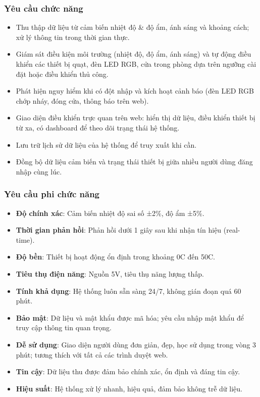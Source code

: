 \subsubsection{Yêu cầu chức năng}
\begin{itemize}
    \item Thu thập dữ liệu từ cảm biến nhiệt độ \& độ ẩm, ánh sáng và khoảng cách; xử lý thông tin trong thời gian thực.
    \item Giám sát điều kiện môi trường (nhiệt độ, độ ẩm, ánh sáng) và tự động điều khiển các thiết bị quạt, đèn LED RGB, cửa trong phòng dựa trên ngưỡng cài đặt hoặc điều khiển thủ công.
    \item Phát hiện nguy hiểm khi có đột nhập và kích hoạt cảnh báo (đèn LED RGB chớp nháy, đóng cửa, thông báo trên web).
    \item Giao diện điều khiển trực quan trên web: hiển thị dữ liệu, điều khiển thiết bị từ xa, có dashboard để theo dõi trạng thái hệ thống.
    \item Lưu trữ lịch sử dữ liệu của hệ thống để truy xuất khi cần.
    \item Đồng bộ dữ liệu cảm biến và trạng thái thiết bị giữa nhiều người dùng đăng nhập cùng lúc.
\end{itemize}

\subsubsection{Yêu cầu phi chức năng}
\begin{itemize}
    \item \textbf{Độ chính xác}: Cảm biến nhiệt độ sai số ±2\%, độ ẩm ±5\%.
    \item \textbf{Thời gian phản hồi}: Phản hồi dưới 1 giây sau khi nhận tín hiệu (real-time).
    \item \textbf{Độ bền}: Thiết bị hoạt động ổn định trong khoảng 0\degree C đến 50\degree C.
    \item \textbf{Tiêu thụ điện năng}: Nguồn 5V, tiêu thụ năng lượng thấp.
    \item \textbf{Tính khả dụng}: Hệ thống luôn sẵn sàng 24/7, không gián đoạn quá 60 phút.
    \item \textbf{Bảo mật}: Dữ liệu và mật khẩu được mã hóa; yêu cầu nhập mật khẩu để truy cập thông tin quan trọng.
    \item \textbf{Dễ sử dụng}: Giao diện người dùng đơn giản, đẹp, học sử dụng trong vòng 3 phút; tương thích với tất cả các trình duyệt web.
    \item \textbf{Tin cậy}: Dữ liệu thu được đảm bảo chính xác, ổn định và đáng tin cậy.
    \item \textbf{Hiệu suất}: Hệ thống xử lý nhanh, hiệu quả, đảm bảo không trễ dữ liệu.
\end{itemize}


